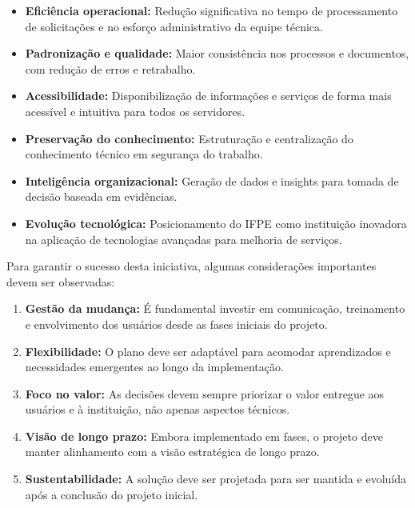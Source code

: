 \documentclass[12pt,a4paper]{article}
\begin{document}
\begin{itemize}
    \item \textbf{Eficiência operacional:} Redução significativa no tempo de processamento de solicitações e no esforço administrativo da equipe técnica.
    
    \item \textbf{Padronização e qualidade:} Maior consistência nos processos e documentos, com redução de erros e retrabalho.
    
    \item \textbf{Acessibilidade:} Disponibilização de informações e serviços de forma mais acessível e intuitiva para todos os servidores.
    
    \item \textbf{Preservação do conhecimento:} Estruturação e centralização do conhecimento técnico em segurança do trabalho.
    
    \item \textbf{Inteligência organizacional:} Geração de dados e insights para tomada de decisão baseada em evidências.
    
    \item \textbf{Evolução tecnológica:} Posicionamento do IFPE como instituição inovadora na aplicação de tecnologias avançadas para melhoria de serviços.
\end{itemize}

Para garantir o sucesso desta iniciativa, algumas considerações importantes devem ser observadas:

\begin{enumerate}
    \item \textbf{Gestão da mudança:} É fundamental investir em comunicação, treinamento e envolvimento dos usuários desde as fases iniciais do projeto.
    
    \item \textbf{Flexibilidade:} O plano deve ser adaptável para acomodar aprendizados e necessidades emergentes ao longo da implementação.
    
    \item \textbf{Foco no valor:} As decisões devem sempre priorizar o valor entregue aos usuários e à instituição, não apenas aspectos técnicos.
    
    \item \textbf{Visão de longo prazo:} Embora implementado em fases, o projeto deve manter alinhamento com a visão estratégica de longo prazo.
    
    \item \textbf{Sustentabilidade:} A solução deve ser projetada para ser mantida e evoluída após a conclusão do projeto inicial.
\end{enumerate}
\end{document}
